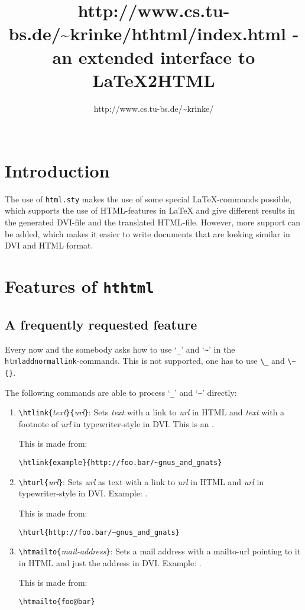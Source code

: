 \documentclass[11pt,a4paper]{article}
\title{\htmladdnormallinkfoot{hthtml}
  {http://www.cs.tu-bs.de/\~{}krinke/hthtml/index.html} 
  - an extended interface to LaTeX2HTML}
\author{\htmladdnormallinkfoot{Jens Krinke}%
  {http://www.cs.tu-bs.de/\~{}krinke/}\\
  \htmailto{j.krinke@tu-bs.de}\\
  \htmladdnormallinkfoot{TU Braunschweig}{http://www.tu-bs.de/}}
\begin{document}
\maketitle
\tableofcontents
\section{Introduction}
The use of \texttt{html.sty} makes the use of some special
\LaTeX-commands possible, which supports the use of HTML-features in
LaTeX and give different results in the generated DVI-file and the
translated HTML-file.  However, more support can be added, which makes
it easier to write documents that are looking similar in DVI and HTML
format. 

\section{Features of \texttt{hthtml}}

\subsection{A frequently requested feature}

Every now and the somebody asks how to use `\verb|_|' and
`\verb|~|' in the \texttt{htmladdnormallink}-commands.  This is
not supported, one has to use \verb|\_| and \verb|\~{}|.  

The following commands are able to process `\verb|_|' and `\verb|~|'
directly:
\begin{enumerate}
\item \verb|\htlink{|\emph{text}\verb|}{|\emph{url}\verb|}|: Sets
  \emph{text} with a link to \emph{url} in HTML and \emph{text} with a
  footnote of \emph{url} in typewriter-style in DVI. This is an
  .

This is made from:
\begin{verbatim}
\htlink{example}{http://foo.bar/~gnus_and_gnats}
\end{verbatim}

\item \verb|\hturl{|\emph{url}\verb|}|: Sets \emph{url} as text with a
  link to \emph{url} in HTML and \emph{url} in typewriter-style in
  DVI. Example: .

This is made from:
\begin{verbatim}
\hturl{http://foo.bar/~gnus_and_gnats}
\end{verbatim}

\item \verb|\htmailto{|\emph{mail-address}\verb|}|: Sets a mail address
  with a mailto-url pointing to it in HTML and just the address in
  DVI.  Example: .

This is made from:
\begin{verbatim}
\htmailto{foo@bar}
\end{verbatim}

\end{enumerate}
\end{document}
